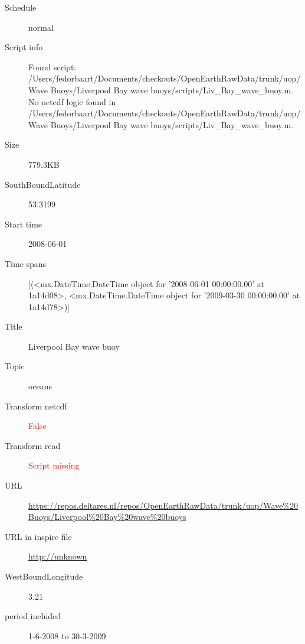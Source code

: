 \documentclass[9]{report}
\begin{document}
\begin{description}
\begin{verbatim}
\end{verbatim}
  \item[Schedule] normal
  \item[Script info] Found script: /Users/fedorbaart/Documents/checkouts/OpenEarthRawData/trunk/uop/Wave Buoys/Liverpool Bay wave buoys/scripts/Liv\_Bay\_wave\_buoy.m.
No netcdf logic found in /Users/fedorbaart/Documents/checkouts/OpenEarthRawData/trunk/uop/Wave Buoys/Liverpool Bay wave buoys/scripts/Liv\_Bay\_wave\_buoy.m.
  \item[Size] 779.3KB
  \item[SouthBoundLatitude] 53.3199
  \item[Start time] 2008-06-01
  \item[Time spans] [(<mx.DateTime.DateTime object for '2008-06-01 00:00:00.00' at 1a14d08>, <mx.DateTime.DateTime object for '2009-03-30 00:00:00.00' at 1a14d78>)]
  \item[Title]  Liverpool Bay wave buoy 
  \item[Topic] oceans
  \item[Transform netcdf] \textcolor{red}{False}
  \item[Transform read] \textcolor{red}{Script missing}
  \item[URL] \href{https://repos.deltares.nl/repos/OpenEarthRawData/trunk/uop/Wave\%20Buoys/Liverpool\%20Bay\%20wave\%20buoys}{https://repos.deltares.nl/repos/OpenEarthRawData/trunk/uop/Wave\%20Buoys/Liverpool\%20Bay\%20wave\%20buoys}
  \item[URL in inspire file] \href{http://unknown}{http://unknown}
  \item[WestBoundLongitude] 3.21
  \item[period included] 1-6-2008 to 30-3-2009
\end{description}
\end{document}
